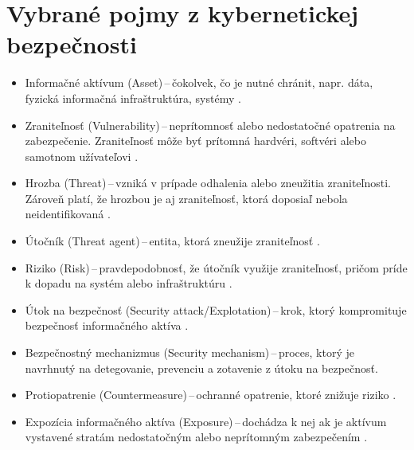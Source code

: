 \section{Vybrané pojmy z kybernetickej bezpečnosti}
\begin{itemize}
	\item Informačné aktívum (Asset)\,--\,čokolvek, čo je nutné chránit, napr. dáta, fyzická informačná infraštruktúra, systémy \cite{McMillan2018}.\\
	
	\item Zraniteľnosť (Vulnerability)\,--\,neprítomnosť alebo nedostatočné opatrenia na zabezpečenie. Zraniteľnosť môže byť prítomná hardvéri, softvéri alebo samotnom užívateľovi \cite{McMillan2018}.\\
	
	\item Hrozba (Threat)\,--\,vzniká v prípade odhalenia alebo zneužitia zraniteľnosti. Zároveň platí, že hrozbou je aj zraniteľnosť, ktorá doposiaľ nebola neidentifikovaná \cite{McMillan2018}.\\
	
	\item Útočník (Threat agent)\,--\,entita, ktorá zneužije zraniteľnosť \cite{McMillan2018}.\\
    
    \item Riziko (Risk)\,--\,pravdepodobnosť, že útočník využije zraniteľnosť, pričom príde k dopadu na systém alebo infraštruktúru \cite{McMillan2018}.\\
  	
  	\item Útok na bezpečnosť (Security attack/Explotation)\,--\,krok, ktorý kompromituje bezpečnosť informačného aktíva \cite{Vyncke2008}.\\
  	    
	\item Bezpečnostný mechanizmus (Security mechanism)\,--\,proces, ktorý je navrhnutý na detegovanie, prevenciu a zotavenie z útoku na bezpečnosť. \\
	
	\item Protiopatrenie (Countermeasure)\,--\,ochranné opatrenie, ktoré znižuje riziko \cite{McMillan2018}.\\
	
	\item Expozícia informačného aktíva (Exposure)\,--\,dochádza k nej ak je aktívum vystavené stratám nedostatočným alebo neprítomným zabezpečením \cite{McMillan2018}.\\
	
\end{itemize}

